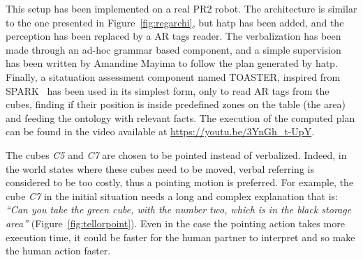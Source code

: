 \documentclass[a4paper,11pt,twoside]{StyleThese}
\begin{document}
This setup has been implemented on a real PR2 robot. The architecture is similar to the one presented in Figure~\ref{fig:regarchi}, but \acrshort{hatp} has been added, and the perception has been replaced by a AR tags reader. The verbalization has been made through an ad-hoc grammar based component, and a simple supervision has been written by Amandine Mayima to follow the plan generated by \acrshort{hatp}. Finally, a sitatuation assessment component named TOASTER, inspired from SPARK~\cite{milliez2014framework} has been used in its simplest form, only to read AR tags from the cubes, finding if their position is inside predefined   zones on the table (the area) and feeding the ontology with relevant facts. The execution of the computed plan can be found in the video available at \url{https://youtu.be/3YnGh\_t-UpY}. 

The cubes \textit{C5} and \textit{C7} are chosen to be pointed instead of verbalized. Indeed, in the world states where these cubes need to be moved, verbal referring is considered to be too costly, thus a pointing motion is preferred. For example, the cube \textit{C7} in the initial situation needs a long and complex explanation that is: \textit{``Can you take the green cube, with the number two, which is in the black storage area''} (Figure~\ref{fig:tellorpoint}). Even in the case the pointing action takes more execution time, it could be faster for the human partner to interpret and so make the human action faster.
\end{document}
